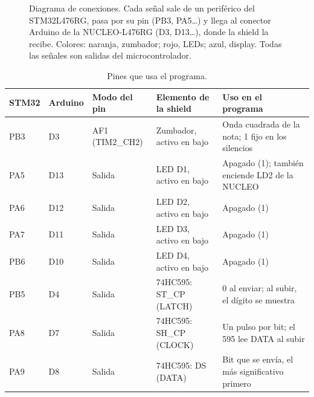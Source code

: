 \documentclass[11pt,letterpaper]{article}
\begin{document}
\begin{figure}[H]
  \caption{Diagrama de conexiones. Cada señal sale de un periférico del STM32L476RG, pasa por su pin
    (PB3, PA5\dots) y llega al conector Arduino de la NUCLEO-L476RG (D3, D13\dots), donde la shield la recibe.
    Colores: naranja, zumbador; rojo, LEDs; azul, display. Todas las señales son salidas del microcontrolador.}
  \label{fig:conexiones}
\end{figure}

\begin{table}[H]
  \centering\footnotesize
  \caption{Pines que usa el programa.}
  \label{tab:pines}
  \begin{tabularx}{\textwidth}{@{}l l l l L@{}}
    \toprule
    STM32 & Arduino & Modo del pin & Elemento de la shield & Uso en el programa \\
    \midrule
    PB3 & D3  & AF1 (TIM2\_CH2) & Zumbador, activo en bajo & Onda cuadrada de la nota; 1 fijo en los silencios \\
    PA5 & D13 & Salida & LED D1, activo en bajo & Apagado (1); también enciende LD2 de la NUCLEO \\
    PA6 & D12 & Salida & LED D2, activo en bajo & Apagado (1) \\
    PA7 & D11 & Salida & LED D3, activo en bajo & Apagado (1) \\
    PB6 & D10 & Salida & LED D4, activo en bajo & Apagado (1) \\
    PB5 & D4  & Salida & 74HC595: ST\_CP (LATCH) & 0 al enviar; al subir, el dígito se muestra \\
    PA8 & D7  & Salida & 74HC595: SH\_CP (CLOCK) & Un pulso por bit; el 595 lee DATA al subir \\
    PA9 & D8  & Salida & 74HC595: DS (DATA) & Bit que se envía, el más significativo primero \\
    \bottomrule
  \end{tabularx}
\end{table}
\end{document}
